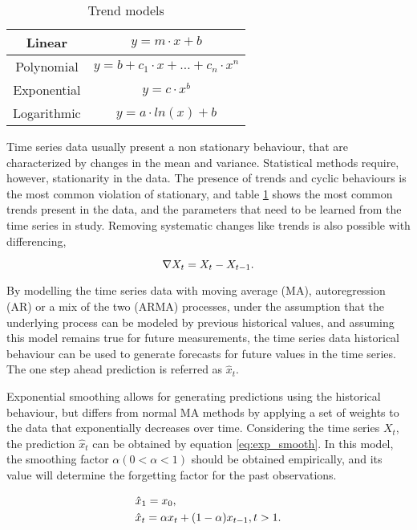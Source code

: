 \begin{table}[h]
\centering
\begin{tabular}{c|c}
Linear      & $y = m \cdot x + b$ \\ \hline
Polynomial  & $y = b + c_1 \cdot x + \dotso + c_n \cdot x^n$  \\ \hline
Exponential & $y = c \cdot  x^b$     \\ \hline
Logarithmic & $y = a \cdot ln(x) + b$
\end{tabular}
\caption{Trend models}
\label{tab:trends_here}
\end{table}

\par Time series data usually present a non stationary behaviour, that are characterized by changes in the mean and variance. Statistical methods require, however,
stationarity in the data. The presence of trends and cyclic behaviours is the most common violation of stationary, and table \ref{tab:trends_here} shows the most 
common trends present in the data, and the parameters that need to be learned from the time series in study. Removing systematic changes like trends is also possible
with differencing,

\begin {equation*}
\centering
\nabla X_t = X_t - X_{t-1}.
\end {equation*}

\par By modelling the time series data with moving average (MA), autoregression (AR) or a mix of the two (ARMA) processes, under the assumption that the underlying
process can be modeled by previous historical values, and assuming this model remains true for future measurements, the time series data historical behaviour can
be used to generate forecasts for future values in the time series. The one step ahead prediction is referred as $\hat{x}_t$.

\par Exponential smoothing allows for generating predictions using the historical behaviour, but differs from normal MA methods by applying a set of weights to the
data that exponentially decreases over time. Considering the time series $X_t$, the prediction $\hat{x}_t$ can be obtained by equation \ref{eq:exp_smooth}. 
In this model, the smoothing factor $\alpha (0 < \alpha < 1)$ should be obtained empirically, and its value will determine the forgetting factor for the past
observations.

\begin {equation*}
    \centering
        \begin {split}
            &\hat{x}_1 = x_0, \\
            &\hat{x}_t = \alpha x_{t} + (1-\alpha)x_{t-1}, t > 1.
        \end {split}
    \label{eq:exp_smooth}
\end {equation*}

